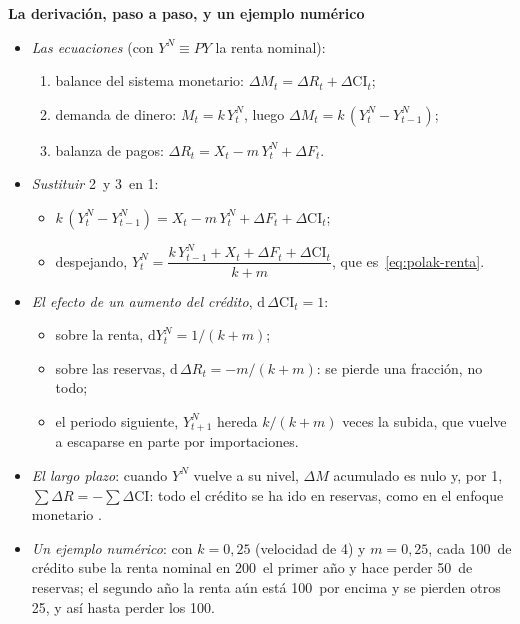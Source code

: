 \documentclass[11pt]{article}
\begin{document}
\begin{anotaciones}
\textbf{La derivación, paso a paso, y un ejemplo numérico}

\begin{itemize}
\item \emph{Las ecuaciones} (con $Y^N\equiv PY$ la renta nominal):
  \begin{enumerate}
  \item balance del sistema monetario: $\Delta M_t=\Delta R_t+\Delta\mathrm{CI}_t$;
  \item demanda de dinero: $M_t=k\,Y^N_t$, luego $\Delta M_t=k\,(Y^N_t-Y^N_{t-1})$;
  \item balanza de pagos: $\Delta R_t=X_t-m\,Y^N_t+\Delta F_t$.
  \end{enumerate}
\item \emph{Sustituir} 2~y 3~en 1:
  \begin{itemize}
  \item $k\,(Y^N_t-Y^N_{t-1})=X_t-m\,Y^N_t+\Delta F_t+\Delta\mathrm{CI}_t$;
  \item despejando, $Y^N_t=\dfrac{k\,Y^N_{t-1}+X_t+\Delta F_t+\Delta\mathrm{CI}_t}{k+m}$, que es~\eqref{eq:polak-renta}.
  \end{itemize}
\item \emph{El efecto de un aumento del crédito}, $\mathrm d\,\Delta\mathrm{CI}_t=1$:
  \begin{itemize}
  \item sobre la renta, $\mathrm dY^N_t=1/(k+m)$;
  \item sobre las reservas, $\mathrm d\,\Delta R_t=-m/(k+m)$: se pierde una fracción, no todo;
  \item el periodo siguiente, $Y^N_{t+1}$ hereda $k/(k+m)$ veces la subida, que vuelve a escaparse en parte por importaciones.
  \end{itemize}
\item \emph{El largo plazo}: cuando $Y^N$ vuelve a su nivel, $\Delta M$ acumulado es nulo y, por 1, $\sum\Delta R=-\sum\Delta\mathrm{CI}$: todo el crédito se ha ido en reservas, como en el enfoque monetario .\findemo
\item \emph{Un ejemplo numérico}: con $k=0{,}25$ (velocidad de 4) y $m=0{,}25$, cada 100~de crédito sube la renta nominal en 200~el primer año y hace perder 50~de reservas; el segundo año la renta aún está 100~por encima y se pierden otros 25, y así hasta perder los 100.
\end{itemize}
\end{anotaciones}
\end{document}
